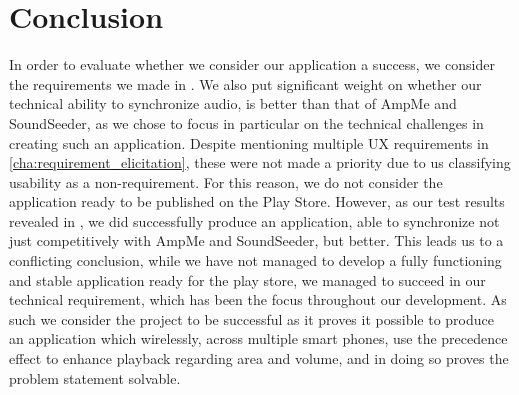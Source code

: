 \section{Conclusion}
In order to evaluate whether we consider our application a success, we consider the requirements we made in .
We also put significant weight on whether our technical ability to synchronize audio, is better than that of AmpMe and SoundSeeder, as we chose to focus in particular on the technical challenges in creating such an application.
Despite mentioning multiple \ac{UX} requirements in \cref{cha:requirement_elicitation}, these were not made a priority due to us classifying usability as a non-requirement.
For this reason, we do not consider the application ready to be published on the Play Store.
However, as our test results revealed in , we did successfully produce an application, able to synchronize not just competitively with AmpMe and SoundSeeder, but better.
This leads us to a conflicting conclusion, while we have not managed to develop a fully functioning and stable application ready for the play store, we managed to succeed in our technical requirement, which has been the focus throughout our development.
As such we consider the project to be successful as it proves it possible to produce an application which wirelessly, across multiple smart phones, use the precedence effect to enhance playback regarding area and volume, and in doing so proves the problem statement solvable.
